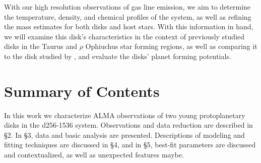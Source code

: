 \begin{figure}[htp]
  \hspace*{\fill}%
  \hfill%
  \hfill%
  \hfill%
  \hfill%
  \hspace*{\fill}%
  \label{fig:m1map}
\end{figure}

With our high resolution observations of gas line emission, we aim to determine the temperature, density, and chemical profiles of the system, as well as refining the mass estimates for both disks and host stars. With this information in hand, we will examine this disk's characteristics in the context of previously studied disks in the Taurus and $\rho$ Ophiuchus star forming regions, as well as comparing it to the disk studied by \citet{Factor2017}, and evaluate the disks' planet forming potentials.






\section{Summary of Contents}

In this work we characterize ALMA observations of two young protoplanetary disks in the d256-1536 system. Observations and data reduction are described in \S2. In \S3, data and basic analysis are presented. Descriptions of modeling and fitting techniques are discussed in \S4, and in \S5, best-fit parameters are discussed and contextualized, as well as unexpected features maybe.





















